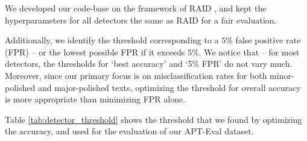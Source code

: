 We developed our code-base on the framework of RAID \cite{dugan2024raid}, and kept the hyperparameters for all detectors the same as RAID for a fair evaluation. 

Additionally, we identify the threshold corresponding to a $5\%$ false positive rate (FPR) -- or the lowest possible FPR if it exceeds $5\%$. We notice that -- for most detectors, the thresholds for `best accuracy' and `5\% FPR' do not vary much. Moreover, since our primary focus is on misclassification rates for both minor-polished and major-polished texts, optimizing the threshold for overall accuracy is more appropriate than minimizing FPR alone.


Table \ref{tab:detector_threshold} shows the threshold that we found by optimizing the accuracy, and used for the evaluation of our APT-Eval dataset. 

